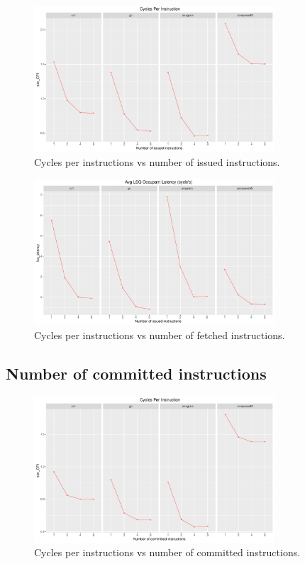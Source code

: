 \documentclass[10pt]{scrartcl}
\begin{document}
\begin{figure}[h]
  \centering
  \includegraphics[width=0.8\textwidth]{Plots/plot_I_sim_CPI}
  \caption{Cycles per instructions vs number of issued instructions.}\label{fig:i_sim_cpi}
\end{figure}

\begin{figure}[h]
  \centering
  \includegraphics[width=0.8\textwidth]{Plots/plot_I_lsq_latency}
  \caption{Cycles per instructions vs number of fetched instructions.}\label{fig:i_lsq_latency}
\end{figure}

\FloatBarrier

\subsection{Number of committed instructions}

\begin{figure}[h]
  \centering
  \includegraphics[width=0.8\textwidth]{Plots/plot_C_sim_CPI}
  \caption{Cycles per instructions vs number of committed instructions.}\label{fig:c_sim_cpi}
\end{figure}
\end{document}
